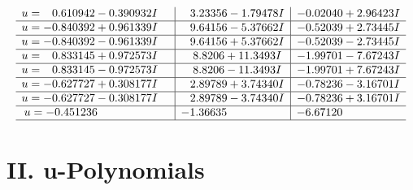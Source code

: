 \documentclass[1p]{elsarticle_modified}
\theoremstyle{definition}
\begin{document}
$$\begin{array}{c|c|c}
\begin{aligned}
u &= \phantom{-}0.610942 - 0.390932 I\end{aligned}
 & \phantom{-}3.23356 - 1.79478 I & -0.02040 + 2.96423 I \\ \hline\begin{aligned}
u &= -0.840392 + 0.961339 I\end{aligned}
 & \phantom{-}9.64156 - 5.37662 I & -0.52039 + 2.73445 I \\ \hline\begin{aligned}
u &= -0.840392 - 0.961339 I\end{aligned}
 & \phantom{-}9.64156 + 5.37662 I & -0.52039 - 2.73445 I \\ \hline\begin{aligned}
u &= \phantom{-}0.833145 + 0.972573 I\end{aligned}
 & \phantom{-}8.8206 + 11.3493 I & -1.99701 - 7.67243 I \\ \hline\begin{aligned}
u &= \phantom{-}0.833145 - 0.972573 I\end{aligned}
 & \phantom{-}8.8206 - 11.3493 I & -1.99701 + 7.67243 I \\ \hline\begin{aligned}
u &= -0.627727 + 0.308177 I\end{aligned}
 & \phantom{-}2.89789 + 3.74340 I & -0.78236 - 3.16701 I \\ \hline\begin{aligned}
u &= -0.627727 - 0.308177 I\end{aligned}
 & \phantom{-}2.89789 - 3.74340 I & -0.78236 + 3.16701 I \\ \hline\begin{aligned}
u &= -0.451236\phantom{ +0.000000I}\end{aligned}
 & -1.36635\phantom{ +0.000000I} & -6.67120\phantom{ +0.000000I}\\
 \hline 
 \end{array}$$\newpage
\newpage\renewcommand{\arraystretch}{1}
\centering \section*{ II. u-Polynomials}
\end{document}

